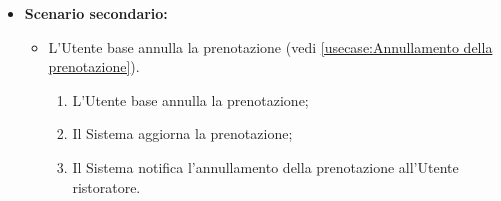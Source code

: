\begin{itemize}
	\item \textbf{Scenario secondario:}
	      \begin{itemize}
		      \item L'Utente base annulla la prenotazione (vedi
		            \autoref{usecase:Annullamento della prenotazione}).
		            \begin{enumerate}
			            \item L'Utente base annulla la prenotazione;
			            \item Il Sistema aggiorna la prenotazione;
			            \item Il Sistema notifica l'annullamento della prenotazione
			                  all'Utente ristoratore.
		            \end{enumerate}
	      \end{itemize}
\end{itemize}

